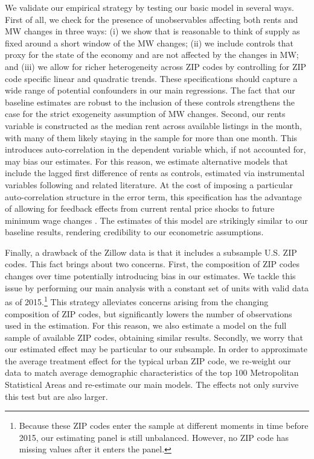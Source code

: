 We validate our empirical strategy by testing our basic model in several ways. First of 
all, we check for the presence of unobservables affecting both rents and MW changes in three 
ways: (i) we show that is reasonable to think of supply as fixed around a short window of the 
MW changes; (ii) we include controls that proxy for the state of the economy and are not 
affected by the changes in MW; and (iii) we allow for richer heterogeneity across ZIP codes 
by controlling for ZIP code specific linear and quadratic trends. 
These specifications should capture a wide range of potential confounders in our main 
regressions. The fact that our baseline estimates are robust to the inclusion of these 
controls strengthens the case for the strict exogeneity assumption of MW changes. Second, 
our rents variable is constructed as the median rent across available listings in the month, 
with many of them likely staying in the sample for more than one month. This introduces 
auto-correlation in the dependent variable which, if not accounted for, may bias our estimates. 
For this reason, we estimate alternative models that include the lagged first difference of rents 
as controls, estimated via instrumental variables following \textcite{ArellanoBond1991} and 
related literature. At the cost of imposing a particular auto-correlation structure in the 
error term, this specification has the advantage of allowing for feedback effects from current 
rental price shocks to future minimum wage changes \parencite{ArellanoHonore2001}. The estimates 
of this model are strikingly similar to our baseline results, rendering credibility to our 
econometric assumptions.

Finally, a drawback of the Zillow data is that it includes a subsample U.S. ZIP codes. This 
fact brings about two concerns. First, the composition of ZIP codes changes over time 
potentially introducing bias in our estimates. We tackle this issue by performing our 
main analysis with a constant set of units with valid data as of 2015.\footnote{Because these 
	ZIP codes enter the sample at different moments in time before 2015, our estimating panel 
	is still unbalanced. However, no ZIP code has missing values after it enters the panel.}
This strategy alleviates concerns arising from the changing composition of ZIP codes, but 
significantly lowers the number of observations used in the estimation. For this reason, we 
also estimate a model on the full sample of available ZIP codes, obtaining similar results. 
Secondly, we worry that our estimated effect may be particular to our subsample. In order to 
approximate the average treatment effect for the typical urban ZIP code, we re-weight our data 
to match average demographic characteristics of the top 100 Metropolitan Statistical Areas 
and re-estimate our main models. The effects not only survive this test but are also larger.

